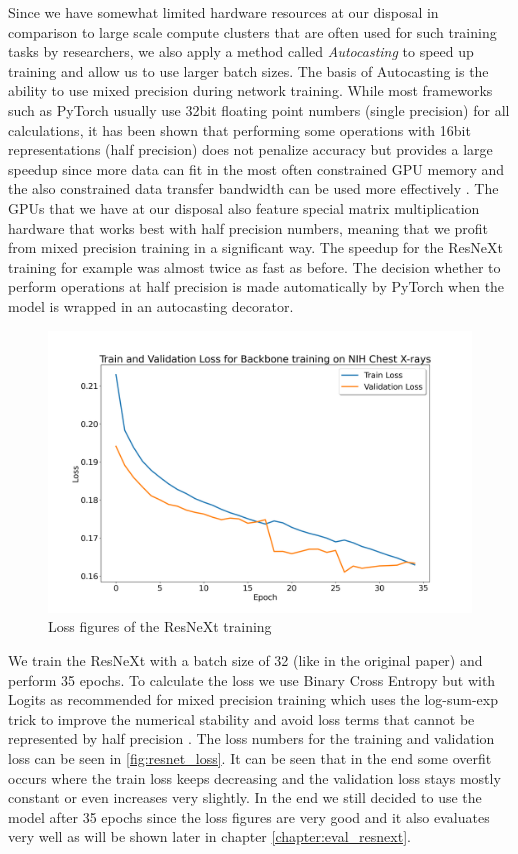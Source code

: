 Since we have somewhat limited hardware resources at our disposal in comparison to large scale compute clusters that are often used for such training tasks by researchers, we also apply a method called \textit{Autocasting} to speed up training and allow us to use larger batch sizes. The basis of Autocasting is the ability to use mixed precision during network training. While most frameworks such as PyTorch usually use 32bit floating point numbers (single precision) for all calculations, it has been shown that performing some operations with 16bit representations (half precision) does not penalize accuracy but provides a large speedup since more data can fit in the most often constrained GPU memory and the also constrained data transfer bandwidth can be used more effectively \autocite{micikevicius_mixed_2018}. The GPUs that we have at our disposal also feature special matrix multiplication hardware that works best with half precision numbers, meaning that we profit from mixed precision training in a significant way. The speedup for the ResNeXt training for example was almost twice as fast as before. The decision whether to perform operations at half precision is made automatically by PyTorch when the model is wrapped in an autocasting decorator.

\begin{figure}
	\centering
	\includegraphics[width=.7\linewidth]{img/loss_backbone_rcnn_35.png}
	\caption{Loss figures of the ResNeXt training}
	\label{fig:resnet_loss}
\end{figure}

We train the ResNeXt with a batch size of 32 (like in the original paper) and perform 35 epochs. To calculate the loss we use Binary Cross Entropy but with Logits as recommended for mixed precision training which uses the log-sum-exp trick to improve the numerical stability and avoid loss terms that cannot be represented by half precision \autocite{pytorch_team_automatic_nodate}. The loss numbers for the training and validation loss can be seen in \vref{fig:resnet_loss}. It can be seen that in the end some overfit occurs where the train loss keeps decreasing and the validation loss stays mostly constant or even increases very slightly. In the end we still decided to use the model after 35 epochs since the loss figures are very good and it also evaluates very well as will be shown later in chapter \vref{chapter:eval_resnext}.


